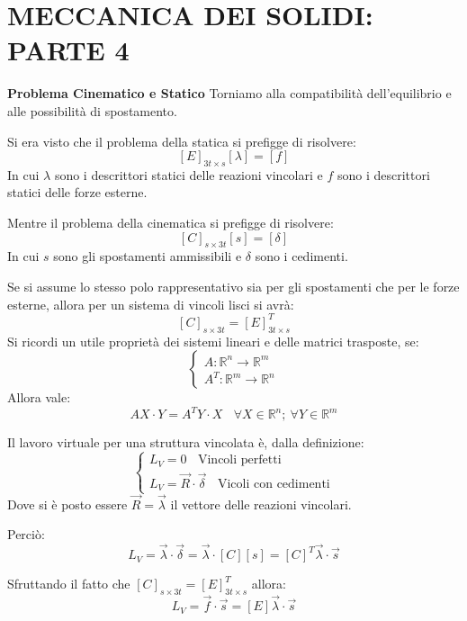 \documentclass{article}
\begin{document}
	\section*{MECCANICA DEI SOLIDI: PARTE 4} %

\begin{adjustwidth}{2in}{} 
{\Large \textbf{Problema Cinematico e Statico}} \mbox{} \newline
Torniamo alla compatibilità dell'equilibrio e alle possibilità di spostamento. \newline 
 
Si era visto che il problema della statica si prefigge di risolvere: 
\[
[E]_{3t \times s} [\lambda] = [f]
\]	
	In cui $\lambda$ sono i descrittori statici delle reazioni vincolari e $f$ sono i descrittori statici delle forze esterne. 
	
Mentre il problema della cinematica si prefigge di risolvere: 
\[
[C]_{s \times 3t} [s] = [\delta]
\]
	In cui $s$ sono gli spostamenti ammissibili e $\delta$ sono i cedimenti. 	
	
Se si assume lo stesso polo rappresentativo sia per gli spostamenti che per le forze esterne, allora per un sistema di vincoli lisci si avrà:
\[
[C]_{s \times 3t} = [E]_{3t \times s}^T 
\]
Si ricordi un utile proprietà dei sistemi lineari e delle matrici trasposte, se: 
\[
\begin{cases}
A: \mathbb{R}^n \rightarrow \mathbb{R}^m \\
A^T: \mathbb{R}^m \rightarrow \mathbb{R}^n 
\end{cases}
\]
Allora vale: 
\[
AX \cdot Y = A^T Y \cdot X ~~~~ \forall X\in \mathbb{R}^n; ~\forall Y \in \mathbb{R}^m
\]
	
	Il lavoro virtuale per una struttura vincolata è, dalla definizione:
	\[
	\begin{cases}
L_V = 0 ~~~~ \text{Vincoli perfetti} \\
L_V = \vec{R} \cdot \vec{\delta} ~~~~ \text{Vicoli con cedimenti}
	\end{cases}
	\]
	Dove si è posto essere $\vec{R} =  \vec{\lambda} $ il vettore delle reazioni vincolari.
	
	Perciò:
	\[ L_V = \vec{\lambda} \cdot \vec{\delta} = \vec{\lambda} \cdot [C][s] = [C]^T \vec{\lambda} \cdot \vec{s}     \]
	
	Sfruttando il fatto che $[C]_{s \times 3t} = [E]_{3t \times s}^T$ allora: 
	\[ L_V =\vec{f}\cdot\vec{s} = [E] \vec{\lambda} \cdot \vec{s}     \]
	

\end{adjustwidth}
\end{document}
